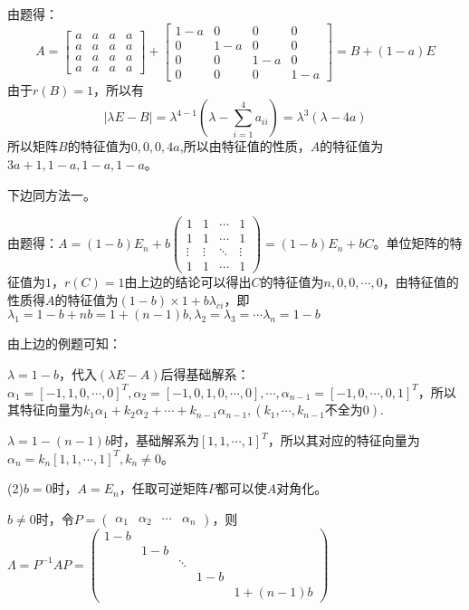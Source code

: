 \documentclass[a4paper]{report}
\begin{document}
\begin{tips}
\begin{jie}
由题得：
\begin{equation*}A=
  \begin{bmatrix}
    a & a& a& a \\
    a & a& a& a \\
    a & a& a& a \\
    a & a& a& a
  \end{bmatrix}+
   \begin{bmatrix}
    1-a & 0& 0& 0 \\
    0 & 1-a& 0& 0 \\
    0 & 0& 1-a& 0 \\
    0 & 0& 0& 1-a
  \end{bmatrix}=B+(1-a)E
\end{equation*}
由于$r(B)=1$，所以有
\begin{equation*}
  |\lambda E -B|=\lambda^{4-1}\left(\lambda-\sum\limits_{i=1}^{4}a_{ii}\right)=
  \lambda^{3}\left(\lambda-4a\right)
\end{equation*}
所以矩阵$B$的特征值为$0,0,0,4a$,所以由特征值的性质，$A$的特征值为$3a+1,1-a,1-a,1-a$。

下边同方法一。
\end{jie}
\hphantom{.}
\end{tips}

\begin{jie}
由题得：$A
=
(1-b)E_{n}+b
\begin{pmatrix}
1&1&\cdots&1\\
1&1&\cdots&1\\
\vdots&\vdots&\ddots&\vdots\\
1&1&\cdots&1
\end{pmatrix}=(1-b)E_{n}+bC
$。单位矩阵的特征值为$1$，$r(C)=1$由上边的结论可以得出$C$的特征值为$n,0,0,\cdots,0$，由特征值的性质得$A$的特征值为$(1-b)\times 1+b\lambda_{ci}$，即$\lambda_1=1-b+nb=1+(n-1)b,\lambda_2=\lambda_3=\cdots\lambda_n=1-b$

由上边的例题可知：

$\lambda=1-b$，代入$(\lambda E-A)$后得基础解系：$
\alpha_1=[-1,1,0,\cdots,0]^T,\alpha_2=[-1,0,1,0,\cdots,0],\cdots,\alpha_{n-1}=[-1,0,\cdots,0,1]^T
$，所以其特征向量为$k_1\alpha_1+k_2\alpha_2+\cdots+k_{n-1}\alpha_{n-1},(k_1,\cdots,k_{n-1}\text{不全为0})$.

$\lambda=1-(n-1)b$时，基础解系为$[1,1,\cdots,1]^T$，所以其对应的特征向量为$\alpha_n=k_{n}[1,1,\cdots,1]^T,k_n\neq 0$。

(2)$b=0$时，$A=E_n$，任取可逆矩阵$P$都可以使$A$对角化。

$b\neq 0$时，令$P=
\begin{pmatrix}
\alpha_1&\alpha_2&\cdots&\alpha_n
\end{pmatrix}
$，则$\Lambda=P^{-1}AP=
\begin{pmatrix}
1-b\\
&1-b\\
&&\ddots\\
&&&1-b\\
&&&&1+(n-1)b
\end{pmatrix}
$
\end{jie}
\end{document}
